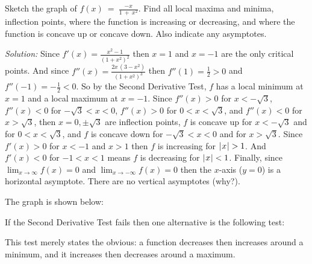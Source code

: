 \begin{exmp}\label{exmp:graph2}
\noindent Sketch the graph of $f(x) ~=~ \frac{-x}{1 ~+~ x^2}$. Find all
local maxima and minima, inflection points, where the function is increasing or
decreasing, and where the function is concave up or concave down. Also indicate
any asymptotes.\vspace{1mm}
\par\noindent\emph{Solution:} Since $f'(x) = \frac{x^2 - 1}{(1+x^2)^2}$
then $x=1$ and $x=-1$ are the only critical points. And since
$f''(x) = \frac{2x\,(3 - x^2)}{(1+x^2)^3}$
then $f''(1) = \frac{1}{2} > 0$ and $f''(-1) = -\frac{1}{2} < 0$. So by the
Second Derivative Test, $f$ has a local minimum at $x=1$ and a local maximum at
$x=-1$. Since $f''(x) > 0$ for $x<-\sqrt{3}$,  $f''(x) < 0$ for $-\sqrt{3}<x<0$,
$f''(x) > 0$ for $0<x<\sqrt{3}$, and $f''(x) < 0$ for $x>\sqrt{3}$, then
$x=0,\pm\sqrt{3}$ are inflection points, $f$ is concave up for $x<-\sqrt{3}$
and for $0<x<\sqrt{3}$, and $f$ is concave down for $-\sqrt{3}<x<0$ and for
$x>\sqrt{3}$. Since $f'(x)>0$ for $x<-1$ and $x>1$ then $f$ is increasing for
$\lvert\mspace{1mu}x\mspace{1mu}\rvert > 1$. And $f'(x)<0$ for $-1<x<1$ means $f$ is decreasing for
$\lvert\mspace{1mu}x\mspace{1mu}\rvert<1$. Finally, since $\displaystyle\lim_{x \to \infty} f(x) = 0$ and
$\displaystyle\lim_{x \to -\infty} f(x) = 0$ then the $x$-axis ($y=0$)
is a horizontal asymptote. There are no vertical asymptotes (why?).

\par\noindent The graph is shown below:

\begin{center}

\end{center}
\end{exmp}
\divider
\vspace{3mm}

If the Second Derivative Test fails then one alternative is the
following test:

This test merely states the obvious: a function decreases then increases around
a minimum, and it increases then decreases around a maximum.

